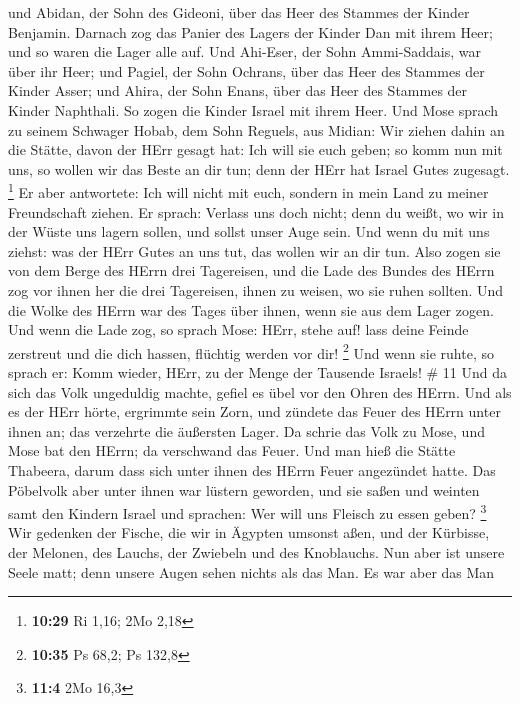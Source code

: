 und Abidan, der Sohn des Gideoni, über das Heer des Stammes der Kinder
Benjamin.  Darnach zog das Panier des Lagers der Kinder Dan
mit ihrem Heer; und so waren die Lager alle auf. Und Ahi-Eser, der Sohn
Ammi-Saddais, war über ihr Heer;  und Pagiel, der Sohn
Ochrans, über das Heer des Stammes der Kinder Asser;  und
Ahira, der Sohn Enans, über das Heer des Stammes der Kinder Naphthali.
 So zogen die Kinder Israel mit ihrem Heer. 
Und Mose sprach zu seinem Schwager Hobab, dem Sohn Reguels, aus Midian:
Wir ziehen dahin an die Stätte, davon der HErr gesagt hat: Ich will sie
euch geben; so komm nun mit uns, so wollen wir das Beste an dir tun;
denn der HErr hat Israel Gutes zugesagt. \footnote{\textbf{10:29} Ri
  1,16; 2Mo 2,18}  Er aber antwortete: Ich will nicht mit
euch, sondern in mein Land zu meiner Freundschaft ziehen. 
Er sprach: Verlass uns doch nicht; denn du weißt, wo wir in der Wüste
uns lagern sollen, und sollst unser Auge sein.  Und wenn du
mit uns ziehst: was der HErr Gutes an uns tut, das wollen wir an dir
tun.  Also zogen sie von dem Berge des HErrn drei
Tagereisen, und die Lade des Bundes des HErrn zog vor ihnen her die drei
Tagereisen, ihnen zu weisen, wo sie ruhen sollten.  Und die
Wolke des HErrn war des Tages über ihnen, wenn sie aus dem Lager zogen.
 Und wenn die Lade zog, so sprach Mose: HErr, stehe auf!
lass deine Feinde zerstreut und die dich hassen, flüchtig werden vor
dir! \footnote{\textbf{10:35} Ps 68,2; Ps 132,8}  Und wenn
sie ruhte, so sprach er: Komm wieder, HErr, zu der Menge der Tausende
Israels! \# 11  Und da sich das Volk ungeduldig machte,
gefiel es übel vor den Ohren des HErrn. Und als es der HErr hörte,
ergrimmte sein Zorn, und zündete das Feuer des HErrn unter ihnen an; das
verzehrte die äußersten Lager.  Da schrie das Volk zu Mose,
und Mose bat den HErrn; da verschwand das Feuer.  Und man
hieß die Stätte Thabeera, darum dass sich unter ihnen des HErrn Feuer
angezündet hatte.  Das Pöbelvolk aber unter ihnen war
lüstern geworden, und sie saßen und weinten samt den Kindern Israel und
sprachen: Wer will uns Fleisch zu essen geben? \footnote{\textbf{11:4}
  2Mo 16,3}  Wir gedenken der Fische, die wir in Ägypten
umsonst aßen, und der Kürbisse, der Melonen, des Lauchs, der Zwiebeln
und des Knoblauchs.  Nun aber ist unsere Seele matt; denn
unsere Augen sehen nichts als das Man.  Es war aber das Man
